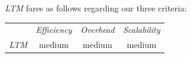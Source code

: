 %
%
%
%
%
\emph{LTM} fares as follows regarding our three  criteria:
\begin{center}
{\footnotesize
\begin{tabular}{rccc}
\multicolumn{1}{r}{} &
\multicolumn{1}{c}{\emph{Efficiency}} &
\multicolumn{1}{c}{\emph{Overhead}} &
\multicolumn{1}{c}{\emph{Scalability}}
\\
\cline{2-4}
\emph{LTM} &
medium &
%
medium &
%
medium
\end{tabular}
}
\end{center}

